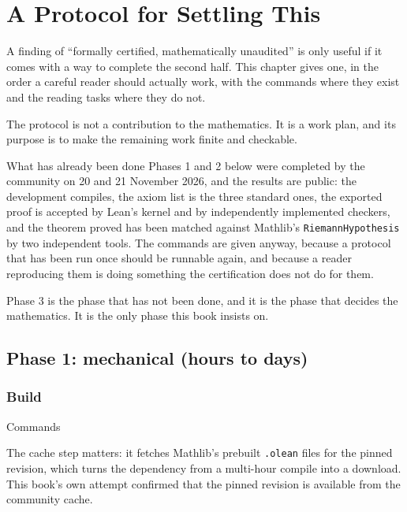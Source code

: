 
\chapter{A Protocol for Settling This}
\label{ch:protocol}

A finding of ``formally certified, mathematically unaudited'' is only useful
if it comes with a way to complete the second half. This chapter gives one,
in the order a careful reader should actually work, with the commands where
they exist and the reading tasks where they do not.

The protocol is not a contribution to the mathematics. It is a work plan, and
its purpose is to make the remaining work finite and checkable.

\begin{seamnote}{What has already been done}
Phases 1 and 2 below were completed by the community on 20 and 21 November
2026, and the results are public: the development compiles, the axiom list is
the three standard ones, the exported proof is accepted by Lean's kernel and
by independently implemented checkers, and the theorem proved has been matched
against Mathlib's \texttt{RiemannHypothesis} by two independent tools. The
commands are given anyway, because a protocol that has been run once should
be runnable again, and because a reader reproducing them is doing something
the certification does not do for them.

Phase 3 is the phase that has not been done, and it is the phase that decides
the mathematics. It is the only phase this book insists on.
\end{seamnote}

\section{Phase 1: mechanical (hours to days)}\subsection{Build}\begin{seamnote}{Commands}
The cache step matters: it fetches Mathlib's prebuilt \texttt{.olean} files
for the pinned revision, which turns the dependency from a multi-hour compile
into a download. This book's own attempt confirmed that the pinned revision
 is available from the
community cache.
\end{seamnote}

